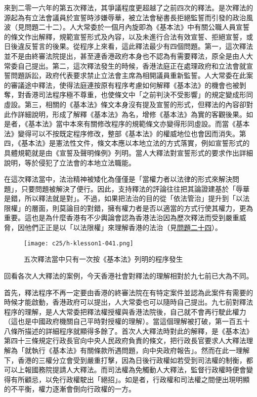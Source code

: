 來到二零一六年的第五次釋法，其爭議程度更超越了之前四次的釋法。是次釋法的源起為有立法會議員於宣誓時涉嫌辱華，被立法會秘書長拒絕監誓而引發的政治風波（見問題二十二）。人大常委於一個月內旋即為《基本法》中有關公職人員宣誓的條文作出解釋，規範宣誓形式及內容，以及未進行合法有效宣誓、拒絕宣誓，或日後違反誓言的後果。從程序上來看，這此釋法最少有四個問題。第一，這次釋法並不是由終審法院提出，甚至連香港政府本身也不認為有需要釋法，原全是由人大常委自己提出。第二，這次釋法發生的時候，香港法庭正在處理政府和立法會就宣誓問題訴訟，政府代表要求禁止立法會主席為相開議員重新監誓。人大常委在此案的審議途中釋法，使得法庭連按原有程序考慮如何解釋《基本法》的機會也被剝奪，對香港司法程序極不尊重，也使條文中「之前判決不受影響」的規定變成形同虛設。第三，相關的《基本法》條文本身沒有提及宣誓的形式，但釋法的內容卻對此作詳細說明，形成了解釋《基本法》為名，增修《基本法》為實的客觀後果。如是者，《基本法》當中本來有關修改程序的規範條文亦變得形同虛設。而當《基本法》變得可以不按既定程序修改，整部《基本法》的權威地位也會因而消失。第四，《基本法》是憲法性文件，條文本應以本地立法的方式落實，例如宣誓形式的具體規範就是由《宣誓及聲明條例》列明。當人大釋法對宣誓形式的要求作出詳細說明，等於侵犯了立法會的本地立法職能。

在這次釋法當中，法治精神被矮化為僅僅是「當權力者以法律的形式來解決問題」，只要問題被解決了便行。因此，支持釋法的評論往往把其論證建基於「辱華是錯，所以釋法就是對」。不過，如果把法治的目的從「依法管治」提升到「以法限權」的層面，則莫論目的對錯，擁有權力者是否以適當的方式行使其權力，更為重要。這也是為什麼香港有不少輿論會認為香港法治因為歷次釋法而受到嚴重威脅，因他們正正是以「以法限權」來理解香港的法治（見\hyperref[sec:sec24]{問題二十四}）。

\begin{figure}[htbp]
    \centering
    \texttt{[image: c25/h-klesson1-041.png]}
    \caption{五次釋法當中只有一次按《基本法》列明的程序發生}
\end{figure}

回看各次人大釋法的案例，今天香港社會對釋法的理解相對於九七前已大為不同。

首先，釋法程序不再一定要由香港的終審法院在有特定案件並認為此案件有需要的時候才能啟動，香港政府可以提出，人大常委也可以隨時自己提出。九七前對釋法程序的理解，是人大常委把釋法權授權與香港法院後，自己就不會再行駛此權力（這也是中國政府機關自己平時對授權的理解）。當這個理解被打破，第一百五十八條所描述的詳細程序就顯得多餘了。首次人大釋法時對此的解釋，是《基本法》第四十三條規定行政長官向中央人民政府負責的條文，把行政長官要求人大釋法理解為「就執行《基本法》有關條款所遇問題，向中央政府報告」。然而在此一理解下，香港的三權分立會受到嚴重打擊，因為日後行政權如若受到司法權的制衡，都可以上報國務院提請人大釋法。而司法權為免觸動人大釋法，監督行政權時便會變得有所顧忌，以免行政權駛出「絕招」。如是者，行政權和司法權之間便出現明顯的不平衡，權力逐漸會倒向行政權的一方。

